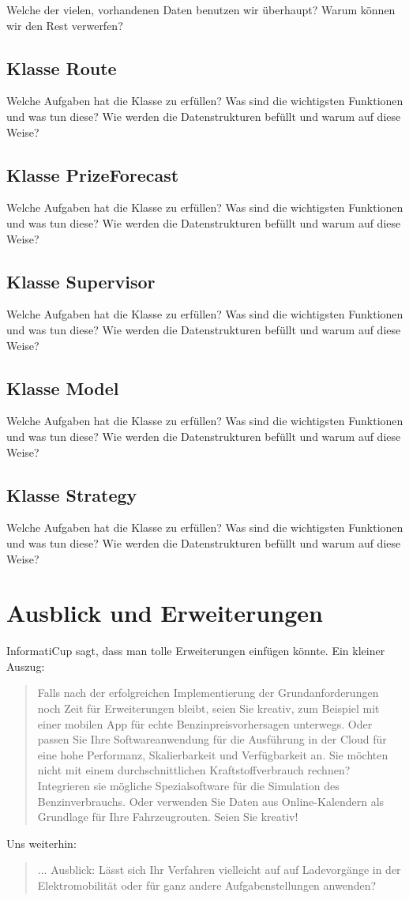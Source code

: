 \documentclass[11pt]{article}
\begin{document}
	Welche der vielen, vorhandenen Daten benutzen wir überhaupt? Warum können wir den Rest verwerfen?
\subsection{Klasse Route}
	Welche Aufgaben hat die Klasse zu erfüllen? Was sind die wichtigsten Funktionen und was tun diese? Wie werden die Datenstrukturen befüllt und warum auf diese Weise?
\subsection{Klasse PrizeForecast}
	Welche Aufgaben hat die Klasse zu erfüllen? Was sind die wichtigsten Funktionen und was tun diese? Wie werden die Datenstrukturen befüllt und warum auf diese Weise?
\subsection{Klasse Supervisor}
	Welche Aufgaben hat die Klasse zu erfüllen? Was sind die wichtigsten Funktionen und was tun diese? Wie werden die Datenstrukturen befüllt und warum auf diese Weise?
\subsection{Klasse Model}
	Welche Aufgaben hat die Klasse zu erfüllen? Was sind die wichtigsten Funktionen und was tun diese? Wie werden die Datenstrukturen befüllt und warum auf diese Weise?
\subsection{Klasse Strategy}
	Welche Aufgaben hat die Klasse zu erfüllen? Was sind die wichtigsten Funktionen und was tun diese? Wie werden die Datenstrukturen befüllt und warum auf diese Weise?

\section{Ausblick und Erweiterungen}
	InformatiCup sagt, dass man tolle Erweiterungen einfügen könnte. Ein kleiner Auszug: 
	\begin{quote}
		Falls nach der erfolgreichen Implementierung der Grundanforderungen noch Zeit für Erweiterungen bleibt, seien Sie kreativ, zum Beispiel mit einer mobilen App für echte Benzinpreisvorhersagen unterwegs. Oder passen Sie Ihre Softwareanwendung für die Ausführung in der Cloud für eine hohe Performanz, Skalierbarkeit und Verfügbarkeit an. Sie möchten nicht mit einem durchschnittlichen Kraftstoffverbrauch rechnen? Integrieren sie mögliche Spezialsoftware für die Simulation des Benzinverbrauchs. Oder verwenden Sie Daten aus Online-Kalendern als Grundlage für Ihre Fahrzeugrouten. Seien Sie kreativ!
	\end{quote}
	Uns weiterhin:
	\begin{quote}
		... Ausblick: Lässt sich Ihr Verfahren vielleicht auf auf Ladevorgänge in der Elektromobilität oder für ganz andere Aufgabenstellungen anwenden?
	\end{quote}
	
\end{document}
